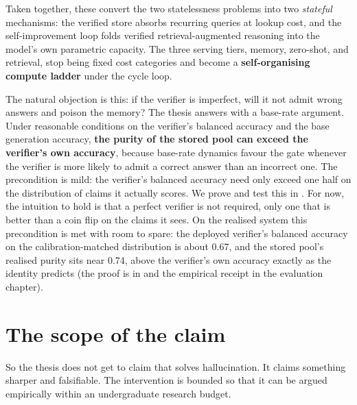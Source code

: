 Taken together, these convert the two statelessness problems into two
\emph{stateful} mechanisms: the verified store absorbs recurring queries at
lookup cost, and the self-improvement loop folds verified retrieval-augmented
reasoning into the model's own parametric capacity. The three serving tiers,
memory, zero-shot, and retrieval, stop being fixed cost categories and become a
\textbf{self-organising compute ladder} under the cycle loop.

\begin{precise}
The natural objection is this: if the verifier is imperfect, will it not admit
wrong answers and poison the memory? The thesis answers with a base-rate
argument. Under reasonable conditions on the verifier's balanced accuracy and
the base generation accuracy, \textbf{the purity of the stored pool can exceed
the verifier's own accuracy}, because base-rate dynamics favour the gate
whenever the verifier is more likely to admit a correct answer than an incorrect
one. The precondition is mild: the verifier's balanced accuracy need only exceed
one half on the distribution of claims it actually scores. We prove and test
this in . For now, the intuition to hold is that a perfect
verifier is not required, only one that is better than a coin flip on the claims
it sees. On the realised system this precondition is met with room to spare: the
deployed verifier's balanced accuracy on the calibration-matched distribution is
about 0.67, and the stored pool's realised purity sits near 0.74, above the
verifier's own accuracy exactly as the identity predicts (the proof is in
 and the empirical receipt in the evaluation chapter).
\end{precise}

\section{The scope of the claim}

So the thesis does not get to claim that \caem{} solves hallucination. It claims
something sharper and falsifiable. The intervention is bounded so that it can be
argued empirically within an undergraduate research budget.


